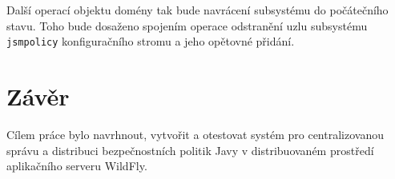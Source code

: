 Další operací objektu domény tak bude navrácení subsystému do počátečního stavu. Toho bude dosaženo spojením operace odstranění uzlu subsystému {\tt jsmpolicy} konfiguračního stromu a jeho opětovné přidání.

\chapter{Závěr}

Cílem práce bylo navrhnout, vytvořit a otestovat systém pro centralizovanou správu a distribuci bezpečnostních politik Javy v distribuovaném prostředí aplikačního serveru WildFly.


